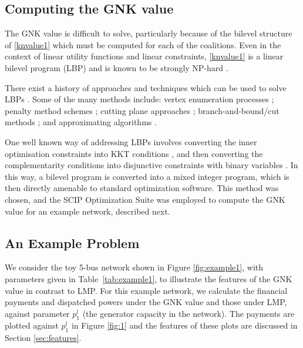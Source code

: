 \subsection{Computing the GNK value}
The GNK value is difficult to solve, particularly because of the bilevel structure of \eqref{knvalue1} which must be computed for each of the coalitions.
Even in the context of linear utility functions and linear constraints, \eqref{knvalue1} is a linear bilevel program (LBP) and is known to be strongly NP-hard \cite{DBLP:journals/tec/SinhaMD18,Ben-Ayed:1990:CDB}.

There exist a history of approaches and techniques which can be used to solve LBPs \cite{DBLP:journals/tec/SinhaMD18,S.Dempe.Optimisations}.
Some of the many methods include: vertex enumeration processes \cite{Bialas:1984:TLP:2784019.2784026,Shi:2005:EKA:2641854.2642183,LIU1995644,article_cutting_plane}; penalty method schemes \cite{KleinertSchmidt2019,ONAL1993126,dempe_optimisation111};
cutting plane approaches \cite{cuttingplane1};
branch-and-bound/cut methods \cite{SHI200551,Hansen:1992:NBR:141164.141181,Audet2007};
and approximating algorithms \cite{Pineda2018,rnnlbp1,genetic_algirthm_blp}.

One well known way of addressing LBPs involves converting the inner optimisation constraints into KKT conditions \cite{kuhn1951nonlinear}, and then converting the complementarity conditions into disjunctive constraints with binary variables \cite{Fortuny-Amat1981,Pineda2018}.
In this way, a bilevel program is converted into a mixed integer program, which is then directly amenable to standard optimization software.
This method was chosen, and the SCIP Optimization Suite \cite{MaherFischerGallyetal.2017} was employed to compute the GNK value for an example network, described next.


\subsection{An Example Problem}\label{sec:example_network}

We consider the toy 5-bus network shown in Figure \ref{fig:example1}, with parameters given in Table~\ref{tab:example1}, to illustrate the features of the GNK value in contrast to LMP.
For this example network, we calculate the financial payments and dispatched powers under the GNK value and those under LMP, against parameter $p_1^l$ (the generator capacity in the network).
The payments are plotted against $p_1^l$ in Figure \ref{fig:1} and the features of these plots are discussed in Section \ref{sec:features}.

